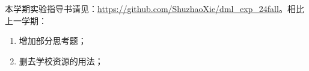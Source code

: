 

\hspace{2em} 本学期实验指导书请见：\url{https://github.com/ShuzhaoXie/dml_exp_24fall}。相比上一学期：
\begin{enumerate}
    \item 增加部分思考题；
    \item 删去学校资源的用法；
\end{enumerate}


\vspace{5em}




